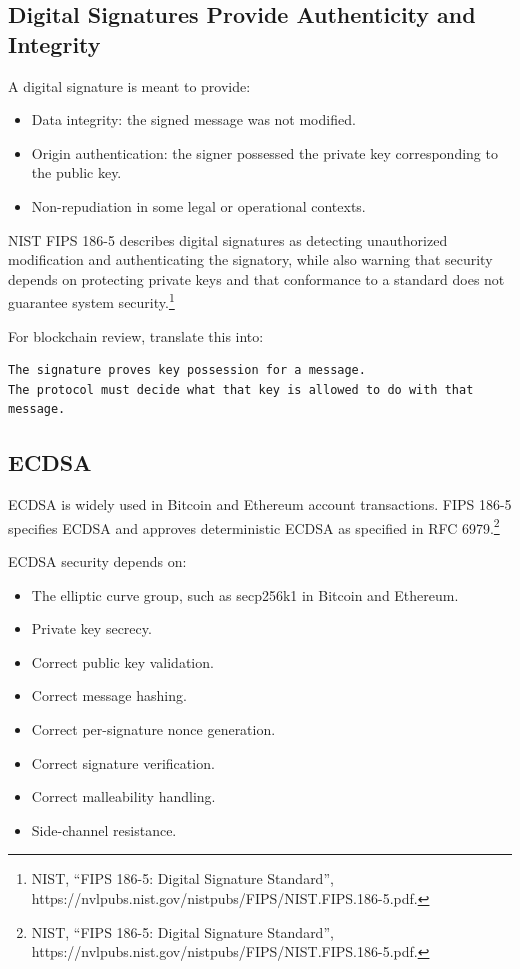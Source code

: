 \subsection{Digital Signatures Provide Authenticity and Integrity}

A digital signature is meant to provide:

\begin{itemize}
\tightlist
\item
  Data integrity: the signed message was not modified.
\item
  Origin authentication: the signer possessed the private key
  corresponding to the public key.
\item
  Non-repudiation in some legal or operational contexts.
\end{itemize}

NIST FIPS 186-5 describes digital signatures as detecting unauthorized
modification and authenticating the signatory, while also warning that
security depends on protecting private keys and that conformance to a
standard does not guarantee system security.\footnote{NIST, ``FIPS
  186-5: Digital Signature Standard'',
  https://nvlpubs.nist.gov/nistpubs/FIPS/NIST.FIPS.186-5.pdf.}

For blockchain review, translate this into:

\begin{lstlisting}
The signature proves key possession for a message.
The protocol must decide what that key is allowed to do with that message.
\end{lstlisting}

\subsection{ECDSA}

ECDSA is widely used in Bitcoin and Ethereum account transactions. FIPS
186-5 specifies ECDSA and approves deterministic ECDSA as specified in
RFC 6979.\footnote{NIST, ``FIPS 186-5: Digital Signature Standard'',
  https://nvlpubs.nist.gov/nistpubs/FIPS/NIST.FIPS.186-5.pdf.}

ECDSA security depends on:

\begin{itemize}
\tightlist
\item
  The elliptic curve group, such as secp256k1 in Bitcoin and Ethereum.
\item
  Private key secrecy.
\item
  Correct public key validation.
\item
  Correct message hashing.
\item
  Correct per-signature nonce generation.
\item
  Correct signature verification.
\item
  Correct malleability handling.
\item
  Side-channel resistance.
\end{itemize}

